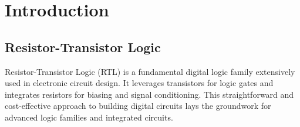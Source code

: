 \section{Introduction}

    \subsection{Resistor-Transistor Logic}
        Resistor-Transistor Logic (RTL) is a fundamental digital logic family extensively used in electronic circuit design. 
        It leverages transistors for logic gates and integrates resistors for biasing and signal conditioning. 
        This straightforward and cost-effective approach to building digital circuits lays the groundwork for advanced logic families and integrated circuits. 

